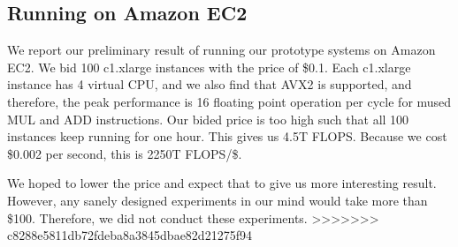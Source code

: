 \documentclass[11pt]{article}
\begin{document}
\subsection{Running on Amazon EC2}

We report our preliminary result of running our prototype
systems on Amazon EC2. We bid 100 c1.xlarge instances with 
the price of \$0.1. Each c1.xlarge instance has
4 virtual CPU, and we also find that AVX2 is supported, and
therefore, the peak performance is 16 floating point
operation per cycle for mused MUL and ADD instructions.
Our bided price is too high such that all 100 instances
keep running for one hour. This gives us 4.5T FLOPS.
Because we cost \$0.002 per second, this is 2250T FLOPS/\$.

We hoped to lower the price and expect that to give us
more interesting result. However, any sanely designed
experiments in our mind would take more than \$100. Therefore,
we did not conduct these experiments.
>>>>>>> c8288e5811db72fdeba8a3845dbae82d21275f94



\end{document}

